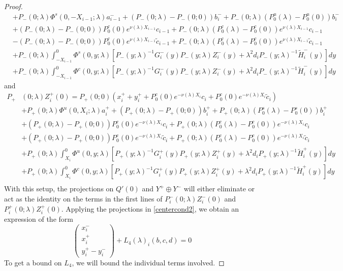\documentclass[thesis.tex]{subfiles}
\begin{document}
\begin{lemma}
\begin{proof}
\begin{align*}
&+ P_-(0; \lambda) \Phi^s(0, -X_{i-1}; \lambda) a_{i-1}^- + (P_-(0; \lambda) - P_-(0; 0))b_i^- + P_-(0; \lambda)(P_0^u(\lambda) - P_0^u(0))b_i^- \\
&+ (P_-(0; \lambda) - P_-(0; 0)) P_0^c(0) e^{\nu(\lambda) X_{i-1}} c_{i-1} + P_-(0; \lambda) (P_0^c(\lambda) - P_0^c(0)) e^{\nu(\lambda) X_{i-1}} c_{i-1} \\
&- (P_-(0; \lambda) - P_-(0; 0)) P_0^c(0) e^{\nu(\lambda) X_{i-1}} \tilde{c}_{i-1} + P_-(0; \lambda) (P_0^c(\lambda) - P_0^c(0)) e^{\nu(\lambda) X_{i-1}} \tilde{c}_{i-1} \\
&+ P_-(0; \lambda) \int_{-X_{i-1}}^0 \Phi^s(0, y; \lambda) [P_-(y; \lambda)^{-1} G_i^-(y) P_-(y; \lambda)Z_i^-(y) + \lambda^2 d_i P_-(y; \lambda)^{-1} \tilde{H}_i^-(y)] dy \\
&+ P_-(0; \lambda) \int_{-X_{i-1}}^0 \Phi^c(0, y; \lambda) [P_-(y; \lambda)^{-1} G_i^-(y) P_-(y; \lambda)Z_i^-(y) + \lambda^2 d_i P_-(y; \lambda)^{-1} \tilde{H}_i^-(y)] dy 
\end{align*}
and
\begin{align*}
P_+&(0; \lambda) Z_i^+(0) = P_+(0; 0)( x_i^+ + y_i^+ + P_0^c(0) e^{-\nu(\lambda)X_i} c_i + P_0^c(0) e^{-\nu(\lambda)X_i} \tilde{c}_i )\\
&+ P_+(0; \lambda) \Phi^u(0, X_i; \lambda) a_i^+ + (P_+(0; \lambda) - P_+(0; 0)) b_i^+ + P_+(0; \lambda) (P_0^s(\lambda) - P_0^s(0)) b_i^+ \\
&+ (P_+(0; \lambda) - P_+(0; 0))P_0^c(0) e^{-\nu(\lambda)X_i} c_i + P_+(0; \lambda) (P_0^c(\lambda) - P_0^c(0)) e^{-\nu(\lambda)X_i} c_i \\
&+ (P_+(0; \lambda) - P_+(0; 0))P_0^c(0) e^{-\nu(\lambda)X_i} \tilde{c}_i + P_+(0; \lambda) (P_0^c(\lambda) - P_0^c(0)) e^{-\nu(\lambda)X_i} \tilde{c}_i \\
&+ P_+(0; \lambda) \int_{X_i}^0 \Phi^u(0, y; \lambda) [P_+(y; \lambda)^{-1} G_i^+(y) P_+(y; \lambda) Z_i^+(y) + \lambda^2 d_i P_+(y; \lambda)^{-1} \tilde{H}_i^+(y)] dy \\
&+ P_+(0; \lambda) \int_{X_i}^0 \Phi^c(0, y; \lambda) [P_+(y; \lambda)^{-1} G_i^+(y) P_+(y; \lambda) Z_i^+(y) + \lambda^2 d_i P_+(y; \lambda)^{-1} \tilde{H}_i^+(y)] dy \\
\end{align*}
With this setup, the projections on $Q'(0)$ and $Y^+ \oplus Y^-$ will either eliminate or act as the identity on the terms in the first lines of $P_i^-(0; \lambda) Z_i^-(0)$ and $P_i^+(0; \lambda) Z_i^+(0)$. Applying the projections in \eqref{centercond2}, we obtain an expression of the form
\begin{equation}\label{projxy}
\begin{pmatrix}x_i^- \\ x_i^+ \\ 
y_i^+ - y_i^- \end{pmatrix} + L_4(\lambda)_i(b, c, d) = 0
\end{equation}
To get a bound on $L_4$, we will bound the individual terms involved. 


\end{proof}
\end{lemma}
\end{document}
